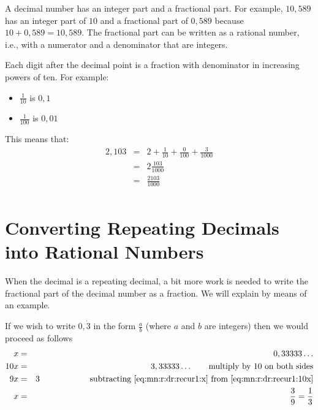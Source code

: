 \documentclass[10pt,a4paper,titlepage,twoside,openright]{report}
\begin{document}
A decimal number has an integer part and a fractional part. For example, $10,589$ has an integer part of $10$ and a fractional part of $0,589$ because $10 + 0,589 = 10,589$. The fractional part can be written as a rational number, i.e., with a numerator and a denominator that are integers.

Each digit after the decimal point is a fraction with denominator in increasing powers of ten. For example:
\begin{itemize}
\item{$\frac {1}{10}$ is $0,1$}
\item{$\frac{1}{100}$ is $0,01$}
\end{itemize}
This means that:
\begin{eqnarray*}
2,103 &=& 2 + \frac 1{10} + \frac{0}{100} +\frac{3}{1000}\\
&=&2\frac{103}{1000}\\
&=&\frac{2103}{1000}\\
\end{eqnarray*}


\section{Converting Repeating Decimals into Rational Numbers}
When the decimal is a repeating decimal, a bit more work is needed to write the fractional part of the decimal number as a fraction. We will explain by means of an example.

If we wish to write $0,\dot{3}$ in the form $\frac{a}{b}$ (where $a$ and $b$ are integers) then we would proceed as follows
\begin{eqnarray}
\label{eq:mn:r:dr:recur1:x}
x &=& 0,33333 \ldots \\
\label{eq:mn:r:dr:recur1:10x}
10x &=& 3,33333 \ldots \qquad
\text{multiply by 10 on both sides} \\ \nonumber
9x &=& 3\qquad\qquad\qquad
\text{subtracting \eqref{eq:mn:r:dr:recur1:x}
from \eqref{eq:mn:r:dr:recur1:10x}} \\ \nonumber
x &=& \frac 39 = \frac 13
\end{eqnarray}
\end{document}
